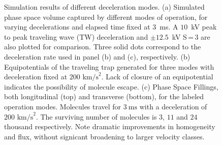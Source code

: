 \documentclass[%
 reprint,
 amsmath,amssymb,
 aps,
prl,
]{revtex4-1}
\begin{document}
\begin{figure}[h]
{%
Simulation results of different deceleration modes. 
(a) Simulated phase space volume captured by different modes of operation, for varying decelerations and elapsed time fixed at $3$~ms. 
A $10$~kV peak to peak traveling wave (TW) deceleration and $\pm 12.5$~kV S\,=\,3 are also plotted for comparison. 
Three solid dots correspond to the deceleration rate used in panel (b) and (c), respectively. 
(b) Equipotentials of the traveling trap generated for three modes with deceleration fixed at $200 \text{ km/s}^2$. 
Lack of closure of an equipotential indicates the possibility of molecule escape. 
(c) Phase Space Fillings, both longitudinal (top) and transverse (bottom), for the labeled operation modes.
Molecules travel for $3~\text{ms}$ with a deceleration of $200 \text{ km/s}^2$. 
The surviving number of molecules is $3$, $11$ and $24$ thousand respectively. 
Note dramatic improvements in homogeneity and flux, without signicant broadening to larger velocity classes.
\vspace{-4mm}}
\label{fig:efftrap}
\end{figure}
\end{document}
